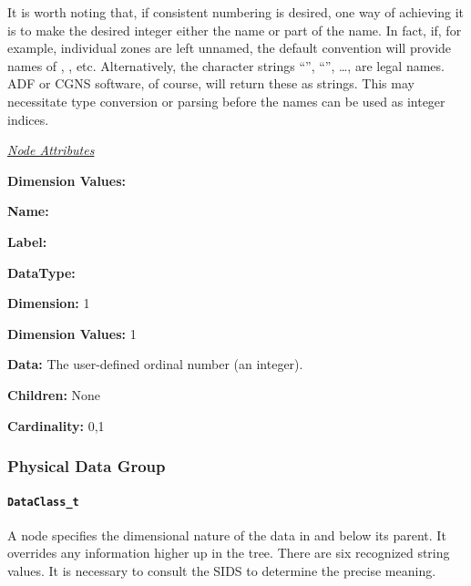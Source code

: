 It is worth noting that, if consistent numbering is desired, one way of
achieving it is to make the desired integer either the name or part of
the name. In fact, if, for example, individual zones are left unnamed,
the default convention will provide names of , ,
etc. Alternatively, the character strings ``'', ``'',
\ldots, are legal names. ADF or CGNS software, of course, will return
these as strings. This may necessitate type conversion or parsing before
the names can be used as integer indices.

\textit{\uline{Node Attributes}}
\begin{Ventryic}{\textbf{Dimension Values:}}
\item [\textbf{Name:}]
\item [\textbf{Label:}]
\item [\textbf{DataType:}]
\item [\textbf{Dimension:}]
      1
\item [\textbf{Dimension Values:}]
      1
\item [\textbf{Data:}]
      The user-defined ordinal number (an integer).
\item [\textbf{Children:}]
      None
\item [\textbf{Cardinality:}]
      0,1
\end{Ventryic}

\subsubsection{Physical Data Group}

\paragraph{\texttt{DataClass\_t}}

A  node specifies the dimensional nature of the
data in and below its parent. It overrides any 
information higher up in the tree. There are six recognized string
values. It is necessary to consult the SIDS to determine the precise
meaning.

